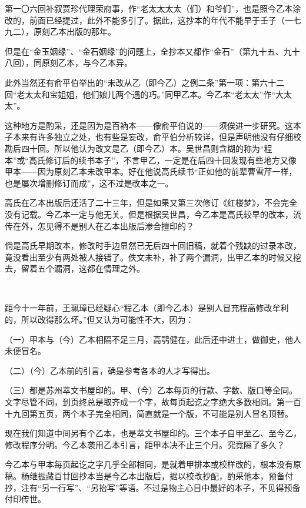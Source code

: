 \par 第一〇六回补叙贾珍代理荣府事，作“老太太太太（们）和爷们”，也是照今乙本涂改的，前面已经提过，此外不能多引了。据此，这抄本的年代不能早于壬子（一七九二），原刻乙本出版的那年。
\par 但是在“金玉姻缘”、“金石姻缘”的问题上，全抄本又都作“金石”（第九十五、九十八回），同原刻乙本，与今乙本异。
\par 此外当然还有俞平伯举出的“未改从乙（即今乙）之例二条”第一项：第六十二回“老太太和宝姐姐，他们娘儿两个遇的巧。”同甲乙本。今乙本“老太太”作“大太太”。
\par 这种地方是酌采，还是因为是百衲本——像俞平伯说的——须俟进一步研究。这本子本来有许多独立之处，也有些是妄改，俞平伯分析较详，但是声明他没有仔细校勘后四十回。所以他认为改文是乙（即今乙）本。吴世昌则含糊的称为“程本”或“高氏修订后的续书本子”，不言甲乙，一定是在后四十回发现有些地方又像甲本——因为原刻乙本未改甲本。好在他说高氏续书“正如他的前辈曹雪芹一样，也是屡次增删修订而成”，这不过是改本之一。
\par 高氏在乙本出版后还活了二十三年，但是如果又第三次修订《红楼梦》，不会完全没有记载。今乙本一定与他无关。但是根据吴世昌，今乙本是高氏较早的改本，流传在外，怎见得不是别人在乙本出版后渗合擅印的？
\par 倘是高氏早期改本，修改时手边显然已无后四十回旧稿，就着个残缺的过录本改，竟没看出至少有两处被人接错了。佚文未补，补了两个漏洞，出甲乙本的时候又挖去，留着五个漏洞，这都在情理之外。
\par  
\par 距今十一年前，王珮璋已经疑心“程乙本（即今乙本）是别人冒充程高修改牟利的，所以改得那么坏。”但又认为可能性不大，因为：
\par （一）甲本与（今）乙本相隔不足三月，高鹗健在，此后还中进士，做御史，他人未便冒名。
\par （二）（今）乙本前的引言，确是参考各本的人才写得出。
\par （三）都是苏州萃文书屋印的。甲、（今）乙本每页的行款、字数、版口等全同。文字尽管不同，到页终总是取齐成一个字，故每页起讫之字绝大多数相同。第一百十九回第五页，两个本子完全相同，简直就是一个版，不可能是别人冒名顶替。
\par 现在我们知道中间另有个乙本，也是萃文书屋印的。三个本子自甲至乙、至今乙，修改程序分明。今乙本袭用乙本引言，距甲本决不止三个月。究竟隔了多久？
\par 今乙本与甲本每页起讫之字几乎全部相同，是就着甲排本或校样改的，根本没有原稿。杨继振藏百廿回抄本当是今乙本出版后，据以校改抄配，酌采他本，预备付抄，注有“另一行写”、“另抬写”等语。不过是物主心目中最好的本子，不见得预备付印传世。
